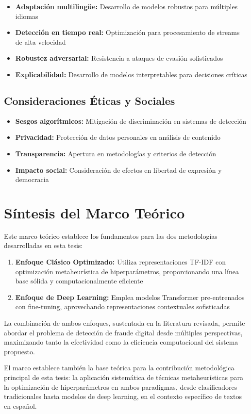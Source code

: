\begin{itemize}
    \item \textbf{Adaptación multilingüe:} Desarrollo de modelos robustos para múltiples idiomas
    \item \textbf{Detección en tiempo real:} Optimización para procesamiento de streams de alta velocidad
    \item \textbf{Robustez adversarial:} Resistencia a ataques de evasión sofisticados
    \item \textbf{Explicabilidad:} Desarrollo de modelos interpretables para decisiones críticas
\end{itemize}

\subsection{Consideraciones Éticas y Sociales}

\begin{itemize}
    \item \textbf{Sesgos algorítmicos:} Mitigación de discriminación en sistemas de detección
    \item \textbf{Privacidad:} Protección de datos personales en análisis de contenido
    \item \textbf{Transparencia:} Apertura en metodologías y criterios de detección
    \item \textbf{Impacto social:} Consideración de efectos en libertad de expresión y democracia
\end{itemize}

\section{Síntesis del Marco Teórico}
\label{sec:sintesis_marco}

Este marco teórico establece los fundamentos para las dos metodologías desarrolladas en esta tesis:

\begin{enumerate}
    \item \textbf{Enfoque Clásico Optimizado:} Utiliza representaciones TF-IDF con optimización metaheurística de hiperparámetros, proporcionando una línea base sólida y computacionalmente eficiente
    
    \item \textbf{Enfoque de Deep Learning:} Emplea modelos Transformer pre-entrenados con fine-tuning, aprovechando representaciones contextuales sofisticadas
\end{enumerate}

La combinación de ambos enfoques, sustentada en la literatura revisada, permite abordar el problema de detección de fraude digital desde múltiples perspectivas, maximizando tanto la efectividad como la eficiencia computacional del sistema propuesto.

El marco establece también la base teórica para la contribución metodológica principal de esta tesis: la aplicación sistemática de técnicas metaheurísticas para la optimización de hiperparámetros en ambos paradigmas, desde clasificadores tradicionales hasta modelos de deep learning, en el contexto específico de textos en español.